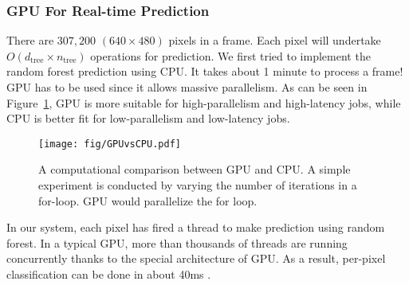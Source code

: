 \subsubsection{GPU For Real-time Prediction}
There are $307,200$ $(640\times 480)$ pixels in a frame. Each pixel will undertake $O(d_{\text{tree}}\times n_{\text{tree}})$ operations for prediction. We first tried to implement the random forest prediction using CPU. It takes about 1 minute to process a frame! GPU has to be used since it allows massive parallelism. As can be seen in Figure~\ref{fig: GPUvsCPU}, GPU is more suitable for high-parallelism and high-latency jobs, while CPU is better fit for low-parallelism and low-latency jobs.

\begin{figure}
	\texttt{[image: fig/GPUvsCPU.pdf]}
    \caption{A computational comparison between GPU and CPU. A simple experiment is conducted by varying the number of iterations in a for-loop. GPU would parallelize the for loop.}
    \label{fig: GPUvsCPU}
\end{figure}

In our system, each pixel has fired a thread to make prediction using random forest. In a typical GPU, more than thousands of threads are running concurrently thanks to the special architecture of GPU. As a result, per-pixel classification can be done in about 40ms .
